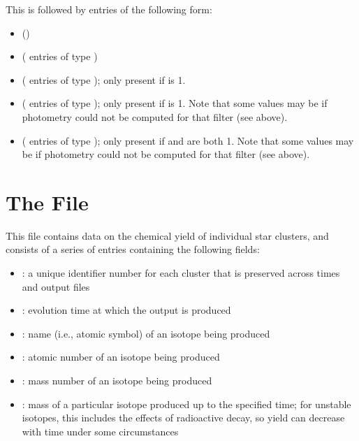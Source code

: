 \documentclass[letterpaper,10pt,english]{sphinxmanual}
\begin{document}
This is followed by  entries of the following form:
\begin{itemize}
\item {} 
 ()

\item {} 
 ( entries of type )

\item {} 
 ( entries of type ); only present if  is 1.

\item {} 
 ( entries of type ); only present if  is 1. Note that some values may be  if photometry could not be computed for that filter (see above).

\item {} 
 ( entries of type ); only present if  and  are both 1. Note that some values may be  if photometry could not be computed for that filter (see above).

\end{itemize}


\section{The  File}
\label{\detokenize{output:ssec-cluster-yield-file}}\label{\detokenize{output:the-cluster-yield-file}}
This file contains data on the chemical yield of individual star
clusters, and consists of a series of entries containing the following
fields:
\begin{itemize}
\item {} 
: a unique identifier number for each cluster that is
preserved across times and output files

\item {} 
: evolution time at which the output is produced

\item {} 
: name (i.e., atomic symbol) of an isotope being produced

\item {} 
: atomic number of an isotope being produced

\item {} 
: mass number of an isotope being produced

\item {} 
: mass of a particular isotope produced up to the specified
time; for unstable isotopes, this includes the effects of
radioactive decay, so yield can decrease with time under some
circumstances

\end{itemize}
\end{document}
